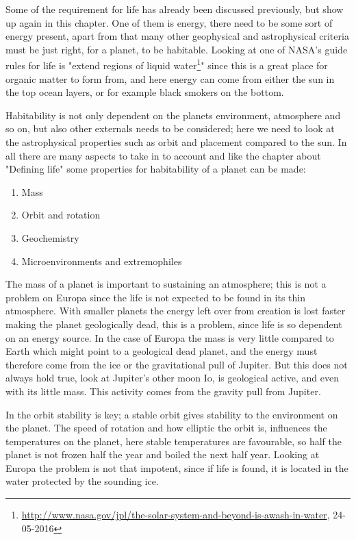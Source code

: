 Some of the requirement for life has already been discussed previously, but show up again in this chapter. One of them is energy, there need to be some sort of energy present, apart from that many other geophysical and astrophysical criteria must be just right, for a planet, to be habitable. Looking at one of NASA's guide rules for life is "extend regions of liquid water\footnote{\url{http://www.nasa.gov/jpl/the-solar-system-and-beyond-is-awash-in-water}, 24-05-2016}"  since this is a great place for organic matter to form from, and here energy can come from either the sun in the top ocean layers, or for example black smokers on the bottom.

Habitability is not only dependent on the planets environment, atmosphere and so on, but also other externals needs to be considered; here we need to look at the astrophysical properties such as orbit and placement compared to the sun. In all there are many aspects to take in to account and like the chapter about "Defining life" some properties for habitability of a planet can be made:

\begin{enumerate}
  \item Mass
  \item Orbit and rotation
  \item Geochemistry
  \item Microenvironments and extremophiles
\end{enumerate}

The mass of a planet is important to sustaining an atmosphere; this is not a problem on Europa since the life is not expected to be found in its thin atmosphere. With smaller planets the energy left over from creation is lost faster making the planet geologically dead, this is a problem, since life is so dependent on an energy source. In the case of Europa the mass is very little compared to Earth which might point to a geological dead planet, and the energy must therefore come from the ice or the gravitational pull of Jupiter. But this does not always hold true, look at Jupiter's other moon Io, is geological active, and even with its little mass. This activity comes from the gravity pull from Jupiter.

In the orbit stability is key; a stable orbit gives stability to the environment on the planet. The speed of rotation and how elliptic the orbit is, influences the temperatures on the planet, here stable temperatures are favourable, so half the planet is not frozen half the year and boiled the next half year. Looking at Europa the problem is not that impotent, since if life is found, it is located in the water protected by the sounding ice.

